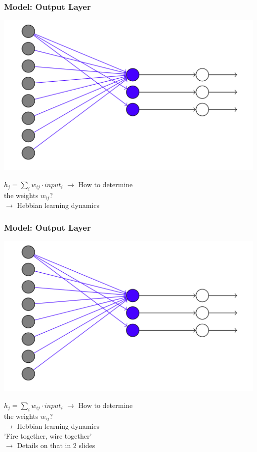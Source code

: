 \begin{frame}
\frametitle{Model: Output Layer}
\begin{multicols}{2}
\begin{center}
\includegraphics[scale=.1]{pics/model_output}
\end{center}
\columnbreak
\begin{center}
$h_j = \sum_i w_{ij} \cdot input_i$
\vskip 5mm
$\rightarrow$ How to determine\\ \hskip 4mm the weights $w_{ij}$?\\
$\rightarrow$ Hebbian learning dynamics\\
\end{center}
\end{multicols}
\end{frame}

\begin{frame}
\frametitle{Model: Output Layer}
\begin{multicols}{2}
\begin{center}
\includegraphics[scale=.1]{pics/model_output}
\end{center}
\columnbreak
\begin{center}
$h_j = \sum_i w_{ij} \cdot input_i$
\vskip 5mm
$\rightarrow$ How to determine\\ \hskip 4mm the weights $w_{ij}$?\\
$\rightarrow$ Hebbian learning dynamics\\
\hskip 7mm 'Fire together, wire together'\\
$\rightarrow$ Details on that in 2 slides
\end{center}
\end{multicols}
\end{frame}

